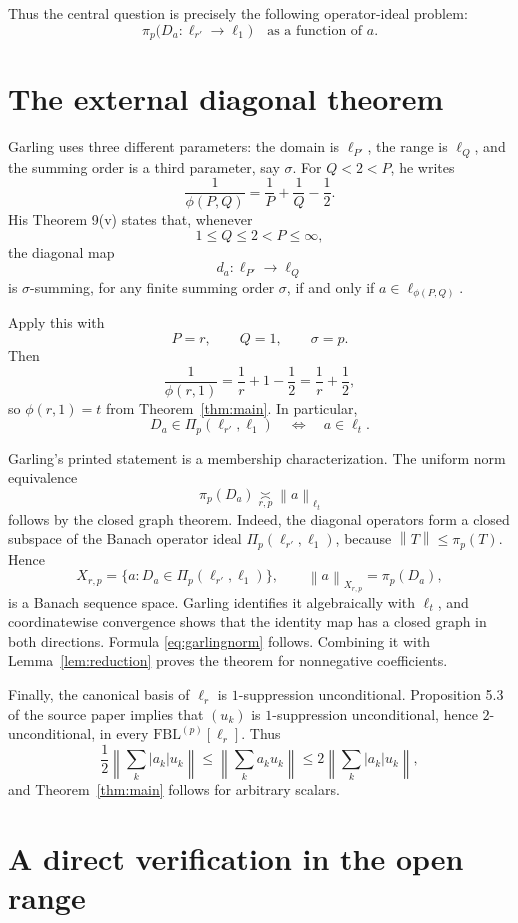 \documentclass[11pt]{article}
\theoremstyle{remark}
\newcommand{\FBL}{\mathrm{FBL}}
\newcommand{\norm}[1]{\left\lVert #1\right\rVert}
\newcommand{\abs}[1]{\left\lvert #1\right\rvert}
\newcommand{\asympC}[1]{\mathrel{\underset{#1}{\asymp}}}
\begin{document}
Thus the central question is precisely the following operator-ideal
problem:
\[
  \pi_p\bigl(D_a:\ell_{r'}\to\ell_1\bigr)
  \quad\text{as a function of }a.
\]

\section{The external diagonal theorem}

Garling uses three different parameters: the domain is $\ell_{P'}$, the
range is $\ell_Q$, and the summing order is a third parameter, say $\sigma$.
For $Q<2<P$, he writes
\[
 \frac1{\phi(P,Q)}=\frac1P+\frac1Q-\frac12.
\]
His Theorem 9(v) states that, whenever
\[
 1\le Q\le2<P\le\infty,
\]
the diagonal map
\[
 d_a:\ell_{P'}\longrightarrow\ell_Q
\]
is $\sigma$-summing, for any finite summing order $\sigma$, if and only if
$a\in\ell_{\phi(P,Q)}$.

Apply this with
\[
  P=r,\qquad Q=1,\qquad \sigma=p.
\]
Then
\[
 \frac1{\phi(r,1)}
 =\frac1r+1-\frac12
 =\frac1r+\frac12,
\]
so $\phi(r,1)=t$ from Theorem~\ref{thm:main}.  In particular,
\[
 D_a\in\Pi_p(\ell_{r'},\ell_1)
 \quad\Longleftrightarrow\quad
 a\in\ell_t.
\]

Garling's printed statement is a membership characterization.  The uniform
norm equivalence
\[
 \pi_p(D_a)\asympC{r,p}\norm{a}_{\ell_t}
 \label{eq:garlingnorm}
 \tag{3.1}
\]
follows by the closed graph theorem.  Indeed, the diagonal operators form a
closed subspace of the Banach operator ideal $\Pi_p(\ell_{r'},\ell_1)$,
because $\norm{T}\le\pi_p(T)$.  Hence
\[
 X_{r,p}=\{a:D_a\in\Pi_p(\ell_{r'},\ell_1)\},
 \qquad \norm{a}_{X_{r,p}}=\pi_p(D_a),
\]
is a Banach sequence space.  Garling identifies it algebraically with
$\ell_t$, and coordinatewise convergence shows that the identity map has a
closed graph in both directions.  Formula \eqref{eq:garlingnorm} follows.
Combining it with Lemma~\ref{lem:reduction} proves the theorem for
nonnegative coefficients.

Finally, the canonical basis of $\ell_r$ is $1$-suppression unconditional.
Proposition 5.3 of the source paper implies that $(u_k)$ is
$1$-suppression unconditional, hence $2$-unconditional, in every
$\FBL^{(p)}[\ell_r]$.  Thus
\[
 \frac12\norm{\sum_k \abs{a_k}u_k}
 \le \norm{\sum_k a_ku_k}
 \le 2\norm{\sum_k \abs{a_k}u_k},
\]
and Theorem~\ref{thm:main} follows for arbitrary scalars.

\section{A direct verification in the open range}
\end{document}
